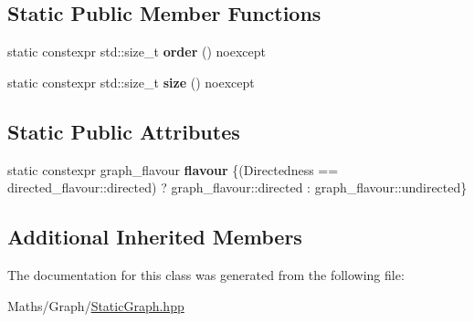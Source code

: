 \subsection*{Static Public Member Functions}
\begin{DoxyCompactItemize}
\item 
\mbox{\label{classsequoia_1_1maths_1_1static__graph_a83b5526afd4a0b99707dc8b5be30cc1e}} 
static constexpr std\+::size\+\_\+t {\bfseries order} () noexcept
\item 
\mbox{\label{classsequoia_1_1maths_1_1static__graph_aec408080178e33352946a38a47241a01}} 
static constexpr std\+::size\+\_\+t {\bfseries size} () noexcept
\end{DoxyCompactItemize}
\subsection*{Static Public Attributes}
\begin{DoxyCompactItemize}
\item 
\mbox{\label{classsequoia_1_1maths_1_1static__graph_a49e946a393caabd399003cd6a6e71dda}} 
static constexpr graph\+\_\+flavour {\bfseries flavour} \{(Directedness == directed\+\_\+flavour\+::directed) ? graph\+\_\+flavour\+::directed \+: graph\+\_\+flavour\+::undirected\}
\end{DoxyCompactItemize}
\subsection*{Additional Inherited Members}


The documentation for this class was generated from the following file\+:\begin{DoxyCompactItemize}
\item 
Maths/\+Graph/\mbox{\hyperlink{_static_graph_8hpp}{Static\+Graph.\+hpp}}\end{DoxyCompactItemize}
